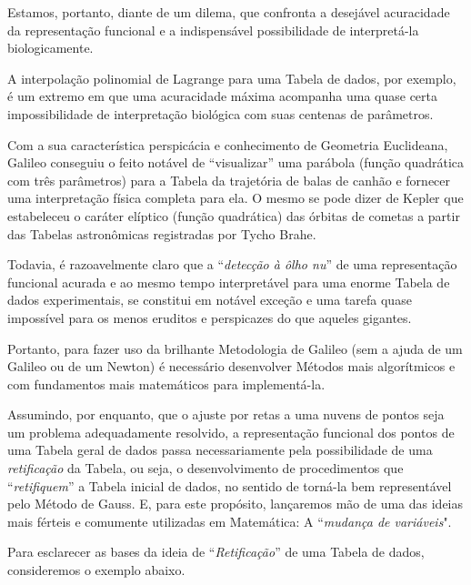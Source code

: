     Estamos, portanto, diante de um dilema, que confronta a desejável acuracidade da representação funcional e a indispensável possibilidade de interpretá-la biologicamente.

    A interpolação polinomial de Lagrange para uma Tabela de dados, por exemplo, é um extremo em que uma acuracidade máxima acompanha uma quase certa impossibilidade de interpretação biológica com suas centenas de parâmetros.

    Com a sua característica perspicácia e conhecimento de Geometria Euclideana, Galileo conseguiu o feito notável de ``visualizar'' uma parábola (função quadrática com três parâmetros) para a Tabela da trajetória de balas de canhão e fornecer uma interpretação física completa para ela. O mesmo se pode dizer de Kepler que estabeleceu o caráter elíptico (função quadrática) das órbitas de cometas a partir das Tabelas astronômicas registradas por Tycho Brahe.

    Todavia, é razoavelmente claro que a ``\textit{detecção à ôlho nu}'' de uma representação funcional acurada e ao mesmo tempo interpretável para uma enorme Tabela de dados experimentais, se constitui em notável exceção e uma tarefa quase impossível para os menos eruditos e perspicazes do que aqueles gigantes.

    Portanto, para fazer uso da brilhante Metodologia de Galileo (sem a ajuda de um Galileo ou de um Newton) é necessário desenvolver Métodos mais algorítmicos e com fundamentos mais matemáticos para implementá-la.
    
    Assumindo, por enquanto, que o ajuste {\red por} retas {\red a uma} nuvens de pontos seja um problema adequadamente resolvido, a representação funcional dos pontos de uma Tabela geral de dados passa necessariamente pela possibilidade de uma \textit{retificação} da Tabela, ou seja, o desenvolvimento de procedimentos que ``\textit{retifiquem}'' a Tabela inicial de dados, no sentido de torná-la bem representável pelo Método de Gauss. E, para este propósito, lançaremos mão de uma das ideias mais férteis e comumente utilizadas em Matemática: A ``\textit{mudança de variáveis}".

    Para esclarecer as bases da ideia de ``\textit{Retificação}'' de uma Tabela de dados, consideremos o exemplo abaixo.

